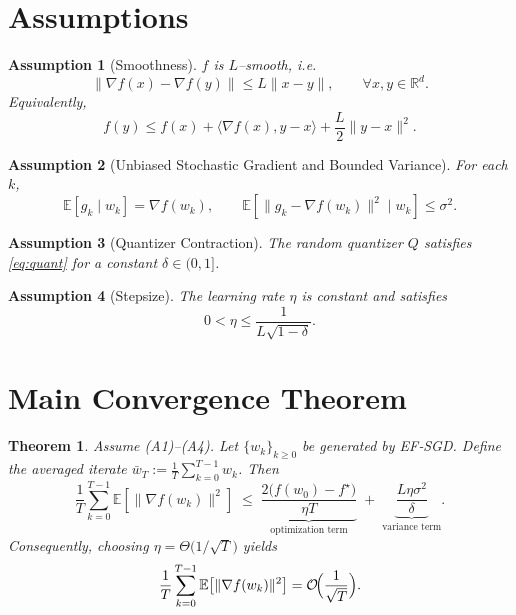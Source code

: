 \documentclass{article}
\newtheorem{theorem}{Theorem}
\newtheorem{assumption}{Assumption}
\newcommand{\E}{\mathbb{E}}
\newcommand{\R}{\mathbb{R}}
\begin{document}
\section*{Assumptions}
\begin{assumption}[Smoothness]
$f$ is $L$–smooth, i.e.
\[
\|\nabla f(x)-\nabla f(y)\|\le L\|x-y\|,\qquad\forall x,y\in\R^{d}.
\tag{A1}
\]
Equivalently,
\[
f(y)\le f(x)+\langle\nabla f(x),y-x\rangle+\frac{L}{2}\|y-x\|^{2}.
\tag{A1'}
\]
\end{assumption}
\begin{assumption}[Unbiased Stochastic Gradient and Bounded Variance]
For each $k$,
\[
\E[g_k\mid w_k]=\nabla f(w_k),\qquad
\E\!\left[\|g_k-\nabla f(w_k)\|^{2}\mid w_k\right]\le\sigma^{2}.
\tag{A2}
\]
\end{assumption}
\begin{assumption}[Quantizer Contraction]
The random quantizer $Q$ satisfies \eqref{eq:quant} for a constant
$\delta\in(0,1]$.
\end{assumption}
\begin{assumption}[Stepsize]
The learning rate $\eta$ is constant and satisfies
\[
0<\eta\le\frac{1}{L\sqrt{1-\delta}}.
\tag{A4}
\]
\end{assumption}

\section*{Main Convergence Theorem}
\begin{theorem}
\label{thm:ef-sgd}
Assume (A1)–(A4). Let $\{w_k\}_{k\ge0}$ be generated by EF‑SGD.
Define the averaged iterate $\bar w_T:=\frac1T\sum_{k=0}^{T-1}w_k$.
Then
\[
\frac1T\sum_{k=0}^{T-1}\E\!\left[\|\nabla f(w_k)\|^{2}\right]
\;\le\;
\underbrace{\frac{2\bigl(f(w_0)-f^{\star}\bigr)}{\eta T}}_{\text{optimization term}}
\;+\;
\underbrace{ \frac{L\eta\sigma^{2}}{\delta}}_{\text{variance term}}.
\tag{T1}
\]
Consequently, choosing $\eta=\Theta\!\bigl(1/\sqrt{T}\bigr)$ yields
\[
\frac1T\sum_{k=0}^{T-1}\E\!\left[\|\nabla f(w_k)\|^{2}\right]=
\mathcal O\!\Bigl(\frac{1}{\sqrt{T}}\Bigr).
\]
\end{theorem}
\end{document}
